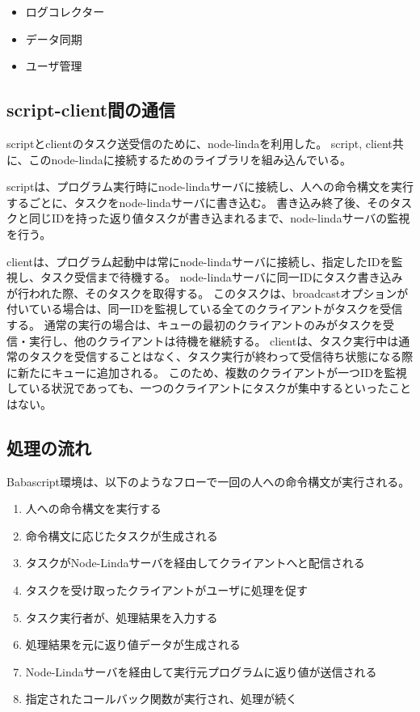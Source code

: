 \begin{itemize}
\itemsep1pt\parskip0pt
\item
  ログコレクター
\item
  データ同期
\item
  ユーザ管理
\end{itemize}

\subsection{script-client間の通信}\label{script-clientux9593ux306eux901aux4fe1}

scriptとclientのタスク送受信のために、node-linda\cite{linda}を利用した。
script,
client共に、このnode-lindaに接続するためのライブラリを組み込んでいる。

scriptは、プログラム実行時にnode-lindaサーバに接続し、人への命令構文を実行するごとに、タスクをnode-lindaサーバに書き込む。
書き込み終了後、そのタスクと同じIDを持った返り値タスクが書き込まれるまで、node-lindaサーバの監視を行う。

clientは、プログラム起動中は常にnode-lindaサーバに接続し、指定したIDを監視し、タスク受信まで待機する。
node-lindaサーバに同一IDにタスク書き込みが行われた際、そのタスクを取得する。
このタスクは、broadcastオプションが付いている場合は、同一IDを監視している全てのクライアントがタスクを受信する。
通常の実行の場合は、キューの最初のクライアントのみがタスクを受信・実行し、他のクライアントは待機を継続する。
clientは、タスク実行中は通常のタスクを受信することはなく、タスク実行が終わって受信待ち状態になる際に新たにキューに追加される。
このため、複数のクライアントが一つIDを監視している状況であっても、一つのクライアントにタスクが集中するといったことはない。

\subsection{処理の流れ}\label{ux51e6ux7406ux306eux6d41ux308c}

Babascript環境は、以下のようなフローで一回の人への命令構文が実行される。

\begin{enumerate}
\def\labelenumi{\arabic{enumi}.}
\itemsep1pt\parskip0pt
\item
  人への命令構文を実行する
\item
  命令構文に応じたタスクが生成される
\item
  タスクがNode-Lindaサーバを経由してクライアントへと配信される
\item
  タスクを受け取ったクライアントがユーザに処理を促す
\item
  タスク実行者が、処理結果を入力する
\item
  処理結果を元に返り値データが生成される
\item
  Node-Lindaサーバを経由して実行元プログラムに返り値が送信される
\item
  指定されたコールバック関数が実行され、処理が続く
\end{enumerate}

